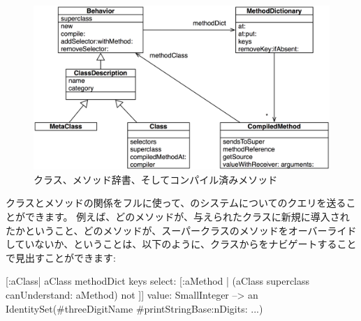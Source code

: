 \documentclass[a4paper,10pt,twoside]{book}
\begin{document}
\begin{figure}[ht]\centering
	\includegraphics[width=\linewidth]{MethodsAsObjects}
	\caption{クラス、メソッド辞書、そしてコンパイル済みメソッド}
\end{figure}

クラスとメソッドの関係をフルに使って、\pharo のシステムについてのクエリを送ることができます。
例えば、どのメソッドが、与えられたクラスに新規に導入されたかということ、\ie どのメソッドが、スーパークラスのメソッドをオーバーライドしていないか、ということは、以下のように、クラスからをナビゲートすることで見出すことができます:
\begin{code}{}
[:aClass| aClass methodDict keys select: [:aMethod |
  (aClass superclass canUnderstand: aMethod) not ]] value: SmallInteger
  --> an IdentitySet(#threeDigitName #printStringBase:nDigits: ...)
\end{code}
\end{document}
